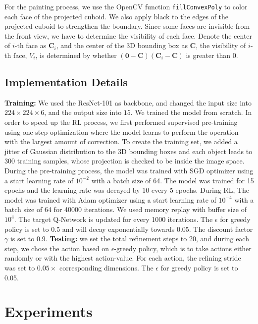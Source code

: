 \documentclass[runningheads]{llncs}
\begin{document}
For the painting process, we use the OpenCV function {\tt{fillConvexPoly}} to color each face of the projected cuboid. We also apply black to the edges of the projected cuboid to strengthen the boundary. Since some faces are invisible from the front view, we have to determine the visibility of each face. Denote the center of $i$-th face as $\mathbf{C}_i$, and the center of the 3D bounding box as $\mathbf{C}$, the visibility of $i$-th face, $V_i$, is determined by whether $(\bm{0}- \bm{C})(\bm{C}_i-\bm{C})$ is greater than 0.

\subsection{Implementation Details}
\textbf{Training:} We used the ResNet-101 as backbone, and changed the input size into $224\times 224 \times 6$, and the output size into $15$. We trained the model from scratch. In order to speed up the RL process, we first performed supervised pre-training using one-step optimization where the model learns to perform the operation with the largest amount of correction. To create the training set, we added a jitter of Gaussian distribution to the 3D bounding boxes and each object leads to 300 training samples, whose projection is checked to be inside the image space. During the pre-training process, the model was trained with SGD optimizer using a start learning rate of $10^{-2}$ with a batch size of 64. The model was trained for 15 epochs and the learning rate was decayed by 10 every 5 epochs. During RL, The model was trained with Adam optimizer using a start learning rate of $10^{-4}$ with a batch size of 64 for 40000 iterations. We used memory replay \cite{schaul2015prioritized} with buffer size of $10^4$. The target Q-Network is updated for every 1000 iterations. The $\epsilon$ for greedy policy is set to 0.5 and will decay exponentially towards 0.05. The discount factor $\gamma$ is set to 0.9.
\noindent
\textbf{Testing:} we set the total refinement steps to 20, and during each step, we chose the action based on  $\epsilon$-greedy policy, which is  to take actions either randomly or with the highest action-value. For each action, the refining stride was set to $0.05\times$ corresponding dimensions. The $\epsilon$ for greedy policy is set to 0.05.


\section{Experiments}
\end{document}
